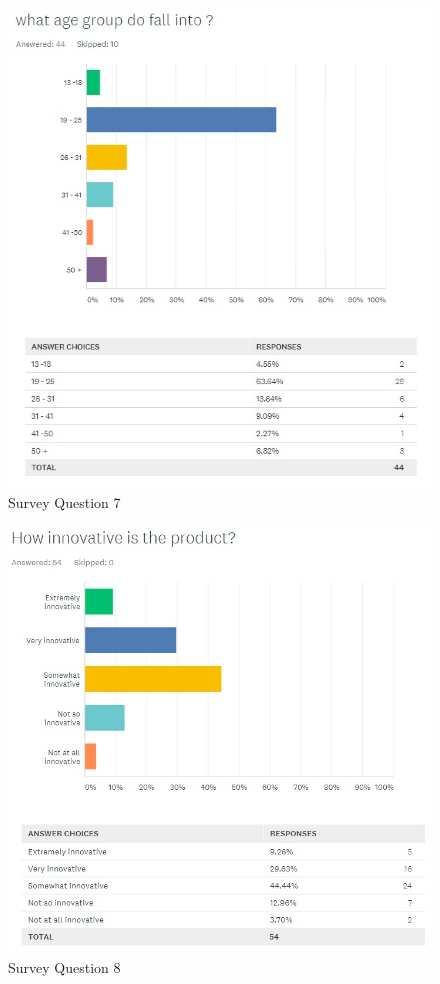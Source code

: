 \documentclass[12pt,a4paper]{article}
\begin{document}
\begin{appendices}
        \begin{figure}[H]
          \centering
          \includegraphics[width=1\textwidth]{../assets/12-2-survey-7.jpg}
          \caption{Survey Question 7}
          \label{fig:Survey Question 7}
        \end{figure}

        \begin{figure}[H]
          \centering
          \includegraphics[width=1\textwidth]{../assets/12-2-survey-8.jpg}
          \caption{Survey Question 8}
          \label{fig:Survey Question 8}
        \end{figure}


\end{appendices}
\end{document}
